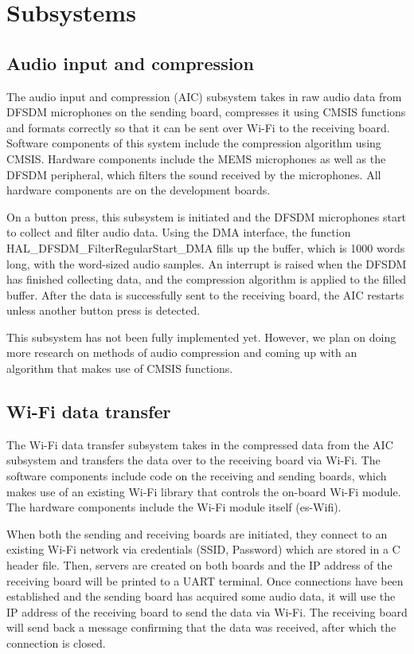 \documentclass[journal]{IEEEtran}
\begin{document}
\section{Subsystems}

\subsection{Audio input and compression}
The audio input and compression (AIC) subsystem takes in raw audio data from DFSDM microphones on the sending board, compresses it using CMSIS functions and formats correctly so that it can be sent over Wi-Fi to the receiving board. Software components of this system include the compression algorithm using CMSIS. Hardware components include the MEMS microphones as well as the DFSDM peripheral, which filters the sound received by the microphones. All hardware components are on the development boards.

On a button press, this subsystem is initiated and the DFSDM microphones start to collect and filter audio data. Using the DMA interface, the function HAL\_DFSDM\_FilterRegularStart\_DMA fills up the buffer, which is 1000 words long, with the word-sized audio samples. An interrupt is raised when the DFSDM has finished collecting data, and the compression algorithm is applied to the filled buffer. After the data is successfully sent to the receiving board, the AIC restarts unless another button press is detected.

This subsystem has not been fully implemented yet. However, we plan on doing more research on methods of audio compression and coming up with an algorithm that makes use of CMSIS functions.

\subsection{Wi-Fi data transfer}
The Wi-Fi data transfer subsystem takes in the compressed data from the AIC subsystem and transfers the data over to the receiving board via Wi-Fi. The software components include code on the receiving and sending boards, which makes use of an existing Wi-Fi library that controls the on-board Wi-Fi module. The hardware components include the Wi-Fi module itself (es-Wifi).

When both the sending and receiving boards are initiated, they connect to an existing Wi-Fi network via credentials (SSID, Password) which are stored in a C header file. Then, servers are created on both boards and the IP address of the receiving board will be printed to a UART terminal. Once connections have been established and the sending board has acquired some audio data, it will use the IP address of the receiving board to send the data via Wi-Fi. The receiving board will send back a message confirming that the data was received, after which the connection is closed.
\end{document}
